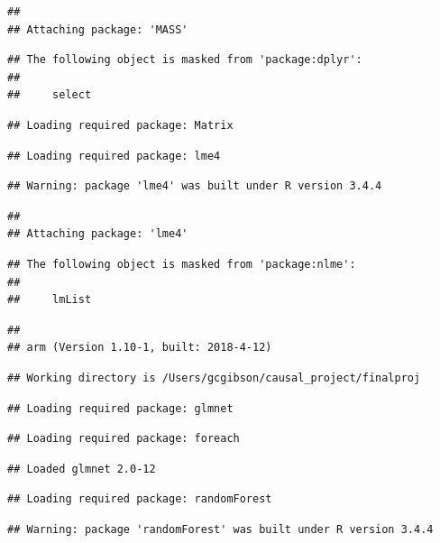 \documentclass[]{article}
\begin{document}
\begin{verbatim}
## 
## Attaching package: 'MASS'
\end{verbatim}

\begin{verbatim}
## The following object is masked from 'package:dplyr':
## 
##     select
\end{verbatim}

\begin{verbatim}
## Loading required package: Matrix
\end{verbatim}

\begin{verbatim}
## Loading required package: lme4
\end{verbatim}

\begin{verbatim}
## Warning: package 'lme4' was built under R version 3.4.4
\end{verbatim}

\begin{verbatim}
## 
## Attaching package: 'lme4'
\end{verbatim}

\begin{verbatim}
## The following object is masked from 'package:nlme':
## 
##     lmList
\end{verbatim}

\begin{verbatim}
## 
## arm (Version 1.10-1, built: 2018-4-12)
\end{verbatim}

\begin{verbatim}
## Working directory is /Users/gcgibson/causal_project/finalproj
\end{verbatim}

\begin{verbatim}
## Loading required package: glmnet
\end{verbatim}

\begin{verbatim}
## Loading required package: foreach
\end{verbatim}

\begin{verbatim}
## Loaded glmnet 2.0-12
\end{verbatim}

\begin{verbatim}
## Loading required package: randomForest
\end{verbatim}

\begin{verbatim}
## Warning: package 'randomForest' was built under R version 3.4.4
\end{verbatim}
\end{document}
